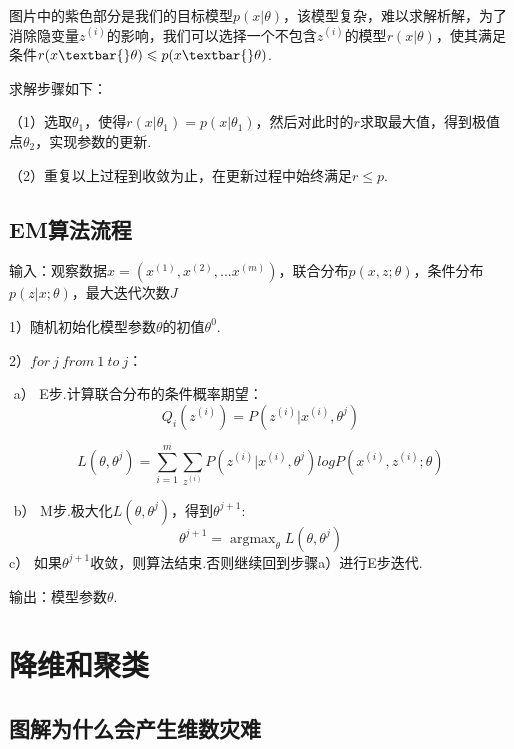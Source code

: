 

​
图片中的紫色部分是我们的目标模型$p(x|\theta)$，该模型复杂，难以求解析解，为了消除隐变量$z^{(i)}$的影响，我们可以选择一个不包含$z^{(i)}$的模型$r(x|\theta)$，使其满足条件$r(x\textbar{}\theta)
\leqslant p(x\textbar{}\theta) $.

求解步骤如下：

（1）选取$\theta_1$，使得$r(x|\theta_1) = p(x|\theta_1)$，然后对此时的$r$求取最大值，得到极值点$\theta_2$，实现参数的更新.

（2）重复以上过程到收敛为止，在更新过程中始终满足$r \leqslant p $.

\subsection{ EM算法流程}\label{emux7b97ux6cd5ux6d41ux7a0b}

输入：观察数据$x=(x^{(1)},x^{(2)},...x^{(m)})$，联合分布$p(x,z ;\theta)$，条件分布$p(z|x; \theta)$，最大迭代次数$J$

1）随机初始化模型参数$\theta$的初值$\theta^0$.

2）$for \ j \ from \ 1 \ to \ j$：

​ a） E步.计算联合分布的条件概率期望： \[
Q_i(z^{(i)}) = P( z^{(i)}|x^{(i)}, \theta^{j})
\]

\[
L(\theta, \theta^{j}) = \sum\limits_{i=1}^m\sum\limits_{z^{(i)}}P( z^{(i)}|x^{(i)}, \theta^{j})log{P(x^{(i)}, z^{(i)};\theta)}
\]

​ b） M步.极大化$L(\theta, \theta^{j})$，得到$\theta^{j+1}$: \[
\theta^{j+1} = \mathop{\arg\max}_\theta L(\theta, \theta^{j})
\] ​ c）
如果$\theta^{j+1}$收敛，则算法结束.否则继续回到步骤a）进行E步迭代.

输出：模型参数$\theta​$.

\section{ 降维和聚类}\label{ux964dux7ef4ux548cux805aux7c7b}

\subsection{图解为什么会产生维数灾难}\label{ux56feux89e3ux4e3aux4ec0ux4e48ux4f1aux4ea7ux751fux7ef4ux6570ux707eux96be}

